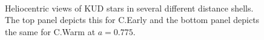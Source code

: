 \begin{figure}
    \centering
  	\\
	 \caption{Heliocentric views of KUD stars in several different distance shells. The top panel depicts this for C.Early and the bottom panel depicts the same for C.Warm at $a=0.775$.}
	\label{fig:lb_halo_c_warm_comparison}
\end{figure}



